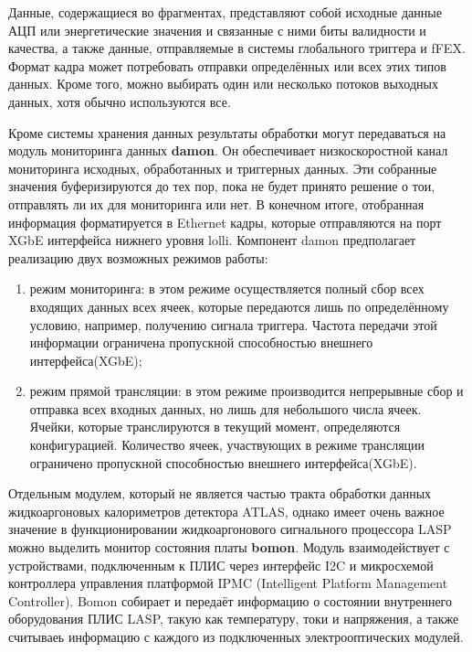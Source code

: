 Данные, содержащиеся во фрагментах, представляют собой исходные данные АЦП или энергетические значения и связанные с ними биты валидности и качества, а также данные, отправляемые в системы глобального триггера и fFEX. Формат кадра может потребовать отправки определённых или всех этих типов данных. Кроме того, можно выбирать один или несколько потоков выходных данных, хотя обычно используются все.\par
Кроме системы хранения данных результаты обработки могут передаваться на модуль мониторинга данных \textbf{damon}. Он обеспечивает низкоскоростной канал мониторинга исходных, обработанных и триггерных данных. Эти собранные значения буферизируются до тех пор, пока не будет принято решение о тои, отправлять ли их для мониторинга или нет. В конечном итоге, отобранная информация форматируется в Ethernet кадры, которые отправляются на порт XGbE интерфейса нижнего уровня lolli. Компонент damon предполагает реализацию двух возможных режимов работы:\par
\begin{enumerate}
    \item режим мониторинга: в этом режиме осуществляется полный сбор всех входящих данных всех ячеек, которые передаются лишь по определённому условию, например, получению сигнала триггера. Частота передачи этой информации ограничена пропускной способностью внешнего интерфейса(XGbE);
    \item режим прямой трансляции: в этом режиме производится непрерывные сбор и отправка всех входных данных, но лишь для небольшого числа ячеек. Ячейки, которые транслируются в текущий момент, определяются конфигурацией. Количество ячеек, участвующих в режиме трансляции ограничено пропускной способностью внешнего интерфейса(XGbE).
\end{enumerate}\par
Отдельным модулем, который не является частью тракта обработки данных жидкоаргоновых калориметров детектора ATLAS, однако имеет очень важное значение в функционировании жидкоаргонового сигнального процессора LASP можно выделить монитор состояния платы \textbf{bomon}. Модуль взаимодействует с устройствами, подключенным к ПЛИС через интерфейс I2C и микросхемой контроллера управления платформой IPMC (Intelligent Platform Management Controller). Bomon собирает и передаёт информацию о состоянии внутреннего оборудования ПЛИС LASP, такую как температуру, токи и напряжения, а также считываеь информацию с каждого из подключенных электрооптических модулей.\par
